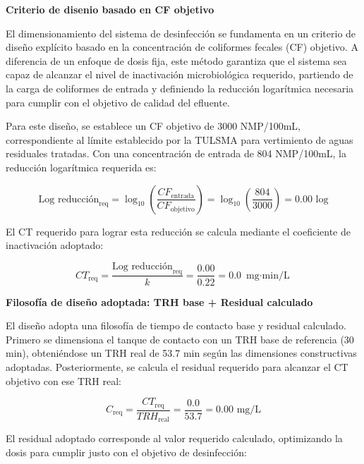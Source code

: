 \documentclass[12pt,a4paper]{article}
\begin{document}
\textbf{Criterio de disenio basado en CF objetivo}

El dimensionamiento del sistema de desinfección se fundamenta en un criterio de diseño explícito basado en la concentración de coliformes fecales (CF) objetivo. A diferencia de un enfoque de dosis fija, este método garantiza que el sistema sea capaz de alcanzar el nivel de inactivación microbiológica requerido, partiendo de la carga de coliformes de entrada y definiendo la reducción logarítmica necesaria para cumplir con el objetivo de calidad del efluente.

Para este diseño, se establece un CF objetivo de 3000 NMP/100mL, correspondiente al límite establecido por la TULSMA para vertimiento de aguas residuales tratadas. Con una concentración de entrada de 804 NMP/100mL, la reducción logarítmica requerida es:

\begin{equation}
\text{Log reducción}_{\text{req}} = \log_{10}\left(\frac{CF_{\text{entrada}}}{CF_{\text{objetivo}}}\right) = \log_{10}\left(\frac{804}{3000}\right) = 0.00 \text{ log}
\end{equation}

El CT requerido para lograr esta reducción se calcula mediante el coeficiente de inactivación adoptado:

\begin{equation}
CT_{\text{req}} = \frac{\text{Log reducción}_{\text{req}}}{k} = \frac{0.00}{0.22} = 0.0 \text{ mg$\cdot$min/L}
\end{equation}

\textbf{Filosofía de diseño adoptada: TRH base + Residual calculado}

El diseño adopta una filosofía de tiempo de contacto base y residual calculado. Primero se dimensiona el tanque de contacto con un TRH base de referencia (30 min), obteniéndose un TRH real de 53.7 min según las dimensiones constructivas adoptadas. Posteriormente, se calcula el residual requerido para alcanzar el CT objetivo con ese TRH real:

\begin{equation}
C_{\text{req}} = \frac{CT_{\text{req}}}{TRH_{\text{real}}} = \frac{0.0}{53.7} = 0.00 \text{ mg/L}
\end{equation}

El residual adoptado corresponde al valor requerido calculado, optimizando la dosis para cumplir justo con el objetivo de desinfección:
\end{document}
